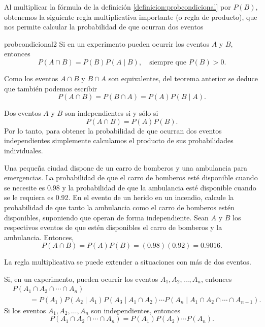 Al multiplicar la fórmula de la definición \ref{definicion:probcondicional} por $P(B)$, obtenemos la siguiente regla multiplicativa importante (o regla de producto), que nos permite calcular la probabilidad de que ocurran dos eventos

\begin{theorem}{}{probcondicional2}
    Si en un experimento pueden ocurrir los eventos $A$ y $B$, entonces
    $$P(A \cap B) = P(B) P(A \mid B), \quad \text{siempre que } P(B) > 0.$$
\end{theorem}

Como los eventos $A \cap B$ y $B \cap A$ son equivalentes, del teorema anterior se deduce que también podemos escribir
$$P(A \cap B) = P(B \cap A) = P(A)P(B \mid A).$$

\begin{theorem}{}{}
    Dos eventos $A$ y $B$ son independientes si y sólo si
    $$P(A \cap B) = P(A) P(B).$$
    Por lo tanto, para obtener la probabilidad de que ocurran dos eventos independientes simplemente calculamos el producto de sus probabilidades individuales.
\end{theorem}

\newpage

\begin{examplebox}{}{}
    Una pequeña ciudad dispone de un carro de bomberos y una ambulancia para emergencias. La probabilidad de que el carro de bomberos esté disponible cuando se necesite es 0.98 y la probabilidad de que la ambulancia esté disponible cuando se le requiera es 0.92. En el evento de un herido en un incendio, calcule la probabilidad de que tanto la ambulancia como el carro de bomberos estén disponibles, suponiendo que operan de forma independiente.
    \tcblower
    \solucion Sean $A$ y $B$ los respectivos eventos de que estén disponibles el carro de bomberos y la ambulancia. Entonces,
    $$P(A \cap B) = P(A)P(B) = (0.98)(0.92) = 0.9016.$$
\end{examplebox}

La regla multiplicativa se puede extender a situaciones con más de dos eventos.

\begin{theorem}{}{}
    Si, en un experimento, pueden ocurrir los eventos $A_1, A_2, \dots, A_n$, entonces
    \begin{align*}
        & P(A_1 \cap A_2 \cap \cdots \cap A_n) \\
        & \hspace{1cm} = P(A_1) P(A_2 \mid A_1) P(A_3 \mid A_1 \cap A_2) \cdots P(A_n \mid A_1 \cap A_2 \cap \cdots \cap A_{n-1}).
    \end{align*}
    Si los eventos $A_1, A_2, \dots, A_n$ son independientes, entonces
    $$P(A_1 \cap A_2 \cap \cdots \cap A_n) = P(A_1) P(A_2) \cdots P(A_n).$$
\end{theorem}

